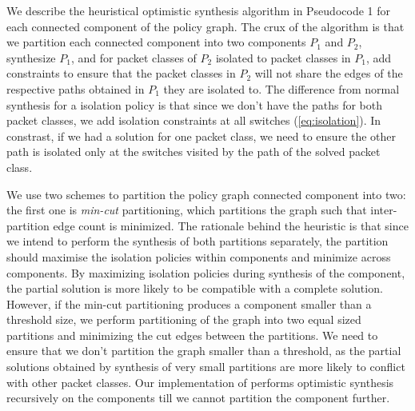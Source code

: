 We describe the heuristical optimistic synthesis algorithm in Pseudocode 1
for each connected component of the policy graph.
 The crux of the algorithm is that we partition each connected component
  into two components $P_1$ and $P_2$,
synthesize $P_1$, and for packet classes of $P_2$
isolated to packet classes in $P_1$, 
add constraints to ensure that the
packet classes in $P_2$ will not share the edges of the respective
paths obtained in $P_1$ they are isolated to. The difference from
normal synthesis for a isolation policy is that since we don't have
the paths for both packet classes, we add isolation constraints at all
switches (\cref{eq:isolation}). In constrast, if we had a solution for
one packet class, we need to ensure the other path is isolated only at
the switches visited by the path of the solved packet
class. 

We use two schemes to partition the policy graph connected component into two: the
first one is \emph{min-cut} partitioning, which partitions the graph
such that inter-partition edge count is minimized. The
rationale behind the heuristic is that since we intend to perform the
synthesis of both partitions separately, the partition should maximise
the isolation policies within components and minimize across
components. By maximizing isolation policies during synthesis of the
component, the partial solution is more likely to be compatible with a
complete solution. However, if the min-cut partitioning produces a
component smaller than a threshold size, we perform partitioning of
the graph into two equal sized partitions and minimizing the cut edges
between the partitions. We need to ensure that we don't partition the
graph smaller than a threshold, as the partial solutions obtained by
synthesis of very small partitions are more likely to conflict with
other packet classes. Our implementation of \Name performs
optimistic synthesis recursively on the components till we cannot partition the
component further. 

